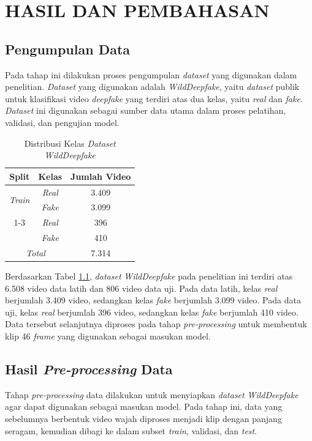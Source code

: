 \newpage
\chapter{HASIL DAN PEMBAHASAN} \label{Bab IV}

\section{Pengumpulan Data} \label{IV.Pengumpulan_Data}
Pada tahap ini dilakukan proses pengumpulan \textit{dataset} yang digunakan dalam penelitian. \textit{Dataset} yang digunakan adalah \textit{WildDeepfake}, yaitu \textit{dataset} publik untuk klasifikasi video \textit{deepfake} yang terdiri atas dua kelas, yaitu \textit{real} dan \textit{fake}. \textit{Dataset} ini digunakan sebagai sumber data utama dalam proses pelatihan, validasi, dan pengujian model.

\begin{table}[htbp]
	\centering
	\caption{Distribusi Kelas \textit{Dataset} \textit{WildDeepfake}}
	\label{table:4.wilddeepfake}
	\begin{tabular}{ccc}
		\toprule
		\textbf{Split} & \textbf{Kelas} & \textbf{Jumlah Video} \\
		\midrule
		\multirow{2}{*}{\textit{Train}} & \textit{Real} & 3.409 \\
		& \textit{Fake} & 3.099 \\
		\cmidrule(lr){1-3}
		\multirow{2}{*}{\textit{Test}} & \textit{Real} & 396 \\
		& \textit{Fake} & 410 \\
		\midrule
		\multicolumn{2}{c}{\textit{Total}} & 7.314 \\
		\bottomrule
	\end{tabular}
\end{table}

Berdasarkan Tabel \ref{table:4.wilddeepfake}, \textit{dataset} \textit{WildDeepfake} pada penelitian ini terdiri atas 6.508 video data latih dan 806 video data uji. Pada data latih, kelas \textit{real} berjumlah 3.409 video, sedangkan kelas \textit{fake} berjumlah 3.099 video. Pada data uji, kelas \textit{real} berjumlah 396 video, sedangkan kelas \textit{fake} berjumlah 410 video. Data tersebut selanjutnya diproses pada tahap \textit{pre-processing} untuk membentuk klip 46 \textit{frame} yang digunakan sebagai masukan model.

\section{Hasil \textit{Pre-processing} Data} \label{IV.Preprocessing}
Tahap \textit{pre-processing} data dilakukan untuk menyiapkan \textit{dataset} \textit{WildDeepfake} agar dapat digunakan sebagai masukan model. Pada tahap ini, data yang sebelumnya berbentuk video wajah diproses menjadi klip dengan panjang seragam, kemudian dibagi ke dalam subset \textit{train}, validasi, dan \textit{test}.

